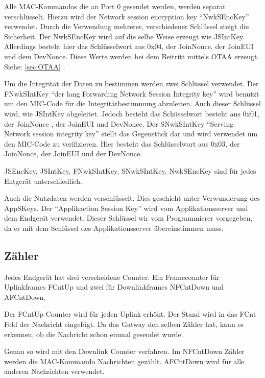 \documentclass[a4paper, 12pt]{article}
\begin{document}
            Alle MAC-Kommandos die an Port 0 gesendet werden, werden separat verschlüsselt. 
            Hierzu wird der Network session encryption key ``NwkSEncKey'' verwendet. 
            Durch die Verwendung mehrerer, verschiedener Schlüssel steigt die Sicherheit. 
            Der NwkSEncKey wird auf die selbe Weise erzeugt wie JSIntKey. Allerdings besteht hier das Schlüsselwort 
            aus 0x04, der JoinNonce, der JoinEUI und dem DevNonce. Diese Werte werden bei dem Beitritt mittels OTAA 
            erzeugt. Siehe: \ref{sec:OTAA} .

            Um die Integrität der Daten zu bestimmen werden zwei Schlüssel verwendet. Der FNwkSIntKey ``der lang Forwarding 
            Network Session Integrity key'' wird benutzt um den MIC-Code für die Integritätbestimmung abzuleiten. Auch 
            dieser Schlüssel wird, wie JSIntKey abgeleitet. Jedoch besteht das Schüsselwort besteht aus 0x01, der JoinNonce , der 
            JoinEUI und DevNonce. Der SNwkSIntKey ``Serving Network session integrity key'' stellt das Gegenstück dar und 
            wird verwendet um den MIC-Code zu verifizieren. Hier besteht das Schlüsselwort aus 0x03, der 
            JoinNonce, der JoinEUI und der DevNonce.

            JSEncKey, JSIntKey, FNwkSIntKey, SNwkSIntKey, NwkSEncKey sind für jedes Entgerät unterschiedlich.

            Auch die Nutzdaten werden verschlüsselt. Dies geschieht unter Verwunderung des AppSKeys. 
            Der ``Applikaction Session Key'' wird vom Applikationsserver und dem Endgerät verwendet. 
            Dieser Schlüssel wir vom Programmierer vorgegeben, da er 
            mit dem Schlüssel des Applikationsserver übereinstimmen muss.\cite[S.50 ff]{LoRaSpec}

        \subsection{Zähler}\label{sec:Zaehler}
            Jedes Endgerät hat drei verscheidene Counter. Ein Framecounter für Uplinkframes FCntUp und zwei für 
            Downlinkframes NFCntDown und AFCntDown. 

            Der FCntUp Counter wird für jeden Uplink erhöht. Der Stand wird in das FCnt Feld der 
            Nachricht eingefügt. Da das Gatway den selben Zähler hat, kann es erkennen, ob die Nachricht schon einmal 
            gesendet wurde.

            Genau so wird mit den Downlink Counter verfahren. Im NFCntDown Zähler werden die 
            MAC-Kommando Nachrichten gezählt. AFCntDown wird für alle anderen Nachrichten verwendet.
            \cite[S.22 ff]{LoRaSecur}
\end{document}
